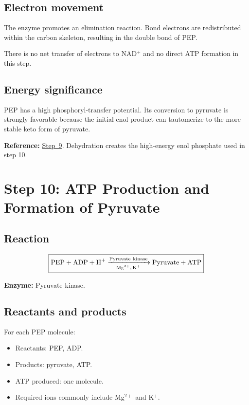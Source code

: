 \documentclass[11pt,a4paper]{article}
\newcommand{\stepref}[1]{\hyperref[step:#1]{Step~#1}}
\newcommand{\Enz}[1]{\textbf{Enzyme:} #1}
\newcommand{\Note}[1]{\par\smallskip
  \noindent\colorbox{gray!12}{
    \parbox{0.96\linewidth}{#1}
  }\par\smallskip}
\begin{document}
\subsection{Electron movement}

The enzyme promotes an elimination reaction. Bond electrons are
redistributed within the carbon skeleton, resulting in the double
bond of PEP.

There is no net transfer of electrons to NAD$^+$ and no direct
ATP formation in this step.

\subsection{Energy significance}

PEP has a high phosphoryl-transfer potential. Its conversion to
pyruvate is strongly favorable because the initial enol product
can tautomerize to the more stable keto form of pyruvate.

\Note{
\textbf{Reference:} \stepref{9}. Dehydration creates the
high-energy enol phosphate used in step 10.
}

\section{Step 10: ATP Production and Formation of Pyruvate}
\label{step:10}

\subsection{Reaction}

\[
\boxed{
\ce{
PEP + ADP + H+
->[Pyruvate\ kinase][Mg^{2+},K+]
Pyruvate + ATP
}
}
\]

\Enz{Pyruvate kinase.}

\subsection{Reactants and products}

For each PEP molecule:

\begin{itemize}
  \item Reactants: PEP, ADP.
  \item Products: pyruvate, ATP.
  \item ATP produced: one molecule.
  \item Required ions commonly include Mg$^{2+}$ and K$^+$.
\end{itemize}
\end{document}
